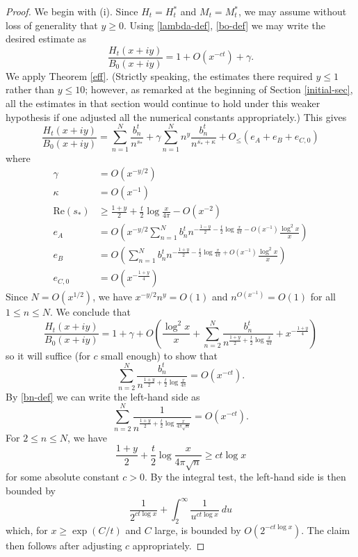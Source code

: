 \begin{proof}  We begin with (i).  Since $H_t = H_t^*$ and $M_t = M_t^*$, we may assume without loss of generality that $y \geq 0$.
Using \eqref{lambda-def}, \eqref{bo-def} we may write the desired estimate as
$$ \frac{H_t(x+iy)}{B_0(x+iy)} = 1 + O(x^{-ct}) + \gamma.$$
We apply Theorem \ref{eff}.  (Strictly speaking, the estimates there required $y \leq 1$ rather than $y \leq 10$; however, as remarked at the beginning of Section \ref{initial-sec}, all the estimates in that section would continue to hold under this weaker hypothesis if one adjusted all the numerical constants appropriately.)  This gives
\begin{equation}\label{exp}
\frac{H_t(x+iy)}{B_0(x+iy)} = \sum_{n=1}^N \frac{b_n^t}{n^{s_*}} + \gamma \sum_{n=1}^N n^y \frac{b_n^t}{n^{\overline{s_*} + \kappa}} + O_{\leq}\left( e_A + e_B + e_{C,0} \right)
\end{equation}
where
\begin{align*}
\gamma &= O( x^{-y/2} ) \\
\kappa &= O(x^{-1}) \\
\mathrm{Re}(s_*) &\geq \frac{1+y}{2} + \frac{t}{2} \log \frac{x}{4\pi}  - O(x^{-2}) \\
e_A &= O\left( x^{-y/2} \sum_{n=1}^N b_n^t n^{-\frac{1-y}{2} - \frac{t}{2} \log \frac{x}{4\pi} - O(x^{-1})} \frac{\log^2 x}{x} \right) \\ 
e_B &= O\left( \sum_{n=1}^N b_n^t n^{-\frac{1+y}{2} - \frac{t}{2} \log \frac{x}{4\pi} + O(x^{-1})} \frac{\log^2 x}{x} \right) \\ 
e_{C,0} &= O\left( x^{-\frac{1+y}{4}} \right)
\end{align*}
Since $N = O(x^{1/2})$, we have $x^{-y/2} n^{y} = O(1)$ and $n^{O(x^{-1})} = O(1)$ for all $1 \leq n \leq N$.  We conclude that
$$\frac{H_t(x+iy)}{B_0(x+iy)} = 1 + \gamma + O\left( \frac{\log^2 x}{x} + \sum_{n=2}^N \frac{b_n^t}{n^{\frac{1+y}{2} + \frac{t}{2} \log \frac{x}{4\pi}}} + x^{-\frac{1+y}{4}} \right) $$
so it will suffice (for $c$ small enough) to show that
$$ \sum_{n=2}^N \frac{b_n^t}{n^{\frac{1+y}{2} + \frac{t}{2} \log \frac{x}{4\pi}}} = O( x^{-ct} ).$$
By \eqref{bn-def} we can write the left-hand side as
$$ \sum_{n=2}^N \frac{1}{n^{\frac{1+y}{2} + \frac{t}{2} \log \frac{x}{4\pi \sqrt{n}}}} = O( x^{-ct} ).$$
For $2 \leq n \leq N$, we have
$$ \frac{1+y}{2} + \frac{t}{2} \log \frac{x}{4\pi \sqrt{n}} \geq c t \log x $$
for some absolute constant $c>0$.  By the integral test, the left-hand side is then bounded by
$$ \frac{1}{2^{c t \log x}} + \int_2^\infty \frac{1}{u^{c t \log x}}\ du$$
which, for $x \geq \exp(C/t)$ and $C$ large, is bounded by $O(2^{-ct\log x})$.  The claim then follows after adjusting $c$ appropriately.


\end{proof}
